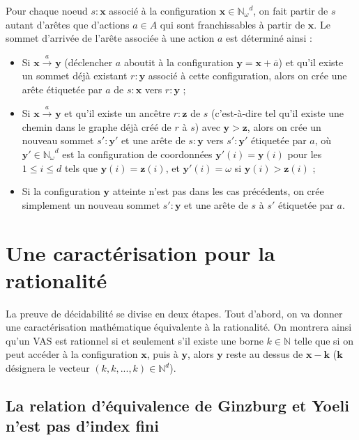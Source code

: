 \documentclass[a4paper,final]{article}
\theoremstyle{definition}
\let\leq\leqslant
\newcommand{\N}{\ensuremath{\mathbb{N}}}
\newcommand{\Nomega}{\ensuremath{\mathbb{N}_\omega}}
\newcommand{\trans}[2]{\ensuremath{\stackrel{#1}{\longrightarrow}_{#2}}}
\newcommand{\vect}[1]{\ensuremath{\mathbf{#1}}}
\newcommand{\valeur}[1]{\ensuremath{\overline{#1}}}
\begin{document}
Pour chaque noeud $s:\vect{x}$ associé à la configuration $\vect{x}\in \Nomega^d$, on fait partir de $s$ autant d'arêtes que d'actions $a\in A$ qui sont franchissables à partir de $\vect{x}$.
Le sommet d'arrivée de l'arête associée à une action $a$ est déterminé ainsi :
\begin{itemize}
    \item Si $\vect{x}\trans{a}{} \vect{y}$ (déclencher $a$ aboutit à la configuration $\vect{y} = \vect{x} + \valeur{a}$) 
    et qu'il existe un sommet déjà existant $r:\vect{y}$ associé à cette configuration, alors on crée une arête étiquetée par $a$ de $s:\vect{x}$ vers $r:\vect{y}$ ;
    \item Si $\vect{x}\trans{a}{} \vect{y}$ et qu'il existe un ancêtre $r:\vect{z}$ de $s$ (c'est-à-dire tel qu'il existe une chemin dans le graphe déjà créé de $r$ à $s$) avec $\vect{y}>\vect{z}$, 
    alors on crée un nouveau sommet $s':\vect{y'}$ et une arête de $s:\vect{y}$ vers $s':\vect{y'}$ étiquetée par $a$, 
    où $\vect{y'}\in \Nomega^d$ est la configuration de coordonnées $\vect{y'}(i) = \vect{y}(i)$ pour les $1\leq i\leq d$ tels que $\vect{y}(i)=\vect{z}(i)$, et $\vect{y'}(i) = \omega$ si $\vect{y}(i)>\vect{z}(i)$ ;
    \item Si la configuration $\vect{y}$ atteinte n'est pas dans les cas précédents, on crée simplement un nouveau sommet $s':\vect{y}$ et une arête de $s$ à $s'$ étiquetée par $a$.
\end{itemize}


\section{Une caractérisation pour la rationalité}

La preuve de décidabilité se divise en deux étapes.
Tout d'abord, on va donner une caractérisation mathématique équivalente à la rationalité.
On montrera ainsi qu'un VAS est rationnel si et seulement s'il existe une borne $k\in\N$ telle que si on peut accéder à la configuration $\vect{x}$, puis à $\vect{y}$, alors $\vect{y}$ reste au dessus de $\vect{x}-\vect{k}$
($\vect{k}$ désignera le vecteur $(k,k,...,k)\in\N^d$).

\subsection{La relation d'équivalence de Ginzburg et Yoeli n'est pas d'index fini}
\end{document}
